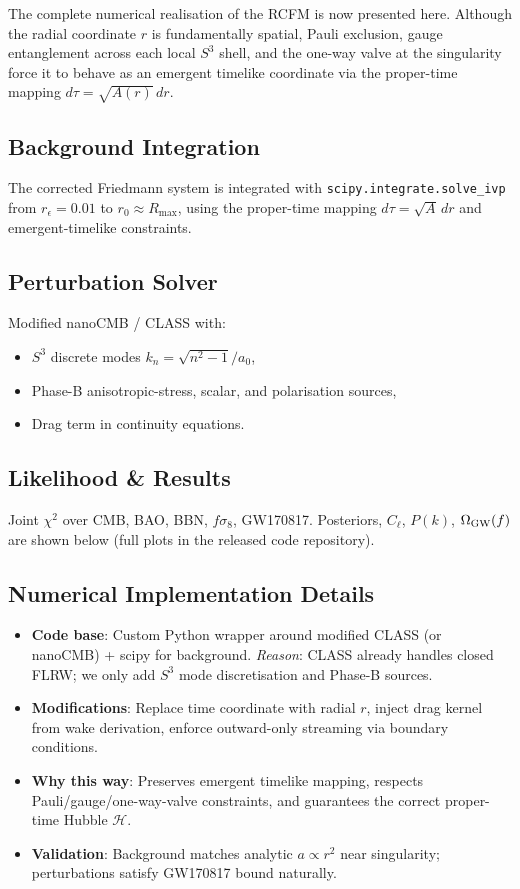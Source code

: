 \documentclass[10pt,twocolumn]{article}
\theoremstyle{definition}
\newcommand{\Rmax}{R_{\max}}
\newcommand{\Hcal}{\mathcal{H}}
\begin{document}
The complete numerical realisation of the RCFM is now presented here. Although the radial coordinate \( r \) is fundamentally spatial, Pauli exclusion, gauge entanglement across each local \( S^3 \) shell, and the one-way valve at the singularity force it to behave as an emergent timelike coordinate via the proper-time mapping \( d\tau = \sqrt{A(r)}\,dr \).

\subsection{Background Integration}
The corrected Friedmann system is integrated with
\texttt{scipy.integrate.solve\_ivp} from \( r_\epsilon = 0.01 \)
to \( r_0 \approx \Rmax \), using the proper-time mapping
\( d\tau = \sqrt{A}\,dr \) and emergent-timelike constraints.

\subsection{Perturbation Solver}
Modified nanoCMB / CLASS with:
\begin{itemize}
\item \( S^3 \) discrete modes \( k_n = \sqrt{n^2-1}/a_0 \),
\item Phase-B anisotropic-stress, scalar, and polarisation
  sources,
\item Drag term in continuity equations.
\end{itemize}

\subsection{Likelihood \& Results}
Joint \(\chi^2\) over CMB, BAO, BBN, \(f\sigma_8\), GW170817.
Posteriors, \(C_\ell\), \(P(k)\), \(\Omega_{\rm GW}(f)\)
are shown below (full plots in the released code repository).

\subsection{Numerical Implementation Details}
\begin{itemize}
\item \textbf{Code base}: Custom Python wrapper around modified
  CLASS (or nanoCMB) + scipy for background.  
  \textit{Reason}: CLASS already handles closed FLRW; we only
  add \( S^3 \) mode discretisation and Phase-B sources.
\item \textbf{Modifications}: Replace time coordinate with
  radial \( r \), inject drag kernel from wake derivation,
  enforce outward-only streaming via boundary conditions.
\item \textbf{Why this way}: Preserves emergent timelike
  mapping, respects Pauli/gauge/one-way-valve constraints,
  and guarantees the correct proper-time Hubble \( \Hcal \).
\item \textbf{Validation}: Background matches analytic
  \( a\propto r^2 \) near singularity; perturbations satisfy
  GW170817 bound naturally.
\end{itemize}
\end{document}
